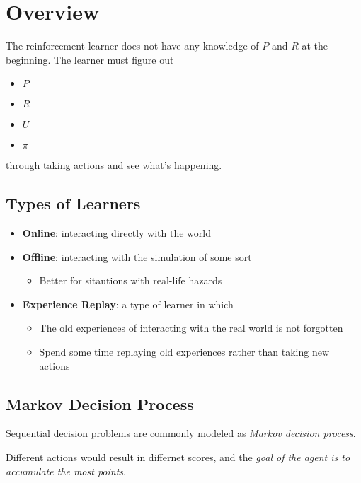 \chapter{Overview}

The reinforcement learner does not have any knowledge of $ P $ and
$ R $ at the beginning. The learner must figure out

\begin{itemize}
  \item $ P $
  \item $ R $
  \item $ U $
  \item $ \pi $
\end{itemize}

through taking actions and see what's happening.

\section{Types of Learners}

  \begin{itemize}
    \item \textbf{Online}: interacting directly with the world
    \item \textbf{Offline}: interacting with the simulation of some sort
    \begin{itemize}
      \item Better for sitautions with real-life hazards
    \end{itemize}

    \item \textbf{Experience Replay}: a type of learner in which
    \begin{itemize}
      \item The old experiences of interacting with the real world
      is not forgotten
      \item Spend some time replaying old experiences rather than taking new
      actions
    \end{itemize}
  \end{itemize}

\section{Markov Decision Process}

  Sequential decision problems are commonly modeled as \emph{Markov decision process}.

  Different actions would result in differnet scores, and the
  \emph{goal of the agent is to accumulate the most points}.

